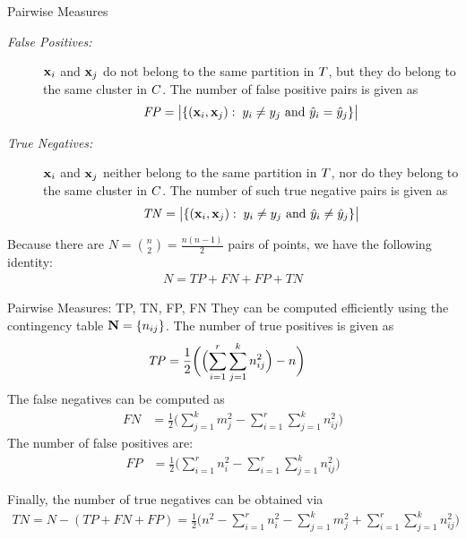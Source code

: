 \begin{frame}{Pairwise Measures}
  \begin{description}
\item[\textit{False Positives:}]
  $\mathbf{x}_i$ and $\mathbf{x}_{j}$ do not belong to the
  same partition in ${\relax T}$, but they do belong to the same cluster in ${\relax C}$.
  The
  number of false positive pairs is given as
  \begin{align*}
  \mathit{FP} = \bigl|\{(\mathbf{x}_i, \mathbf{x}_{j}):\; y_i \ne y_{j}
  \text{ and } \hat{y}_i = \hat{y}_{j} \}\bigr|
  \end{align*}

\item[\textit{True Negatives:}] $\mathbf{x}_i$ and $\mathbf{x}_{j}$ neither belong to
  the same partition in ${\relax T}$, nor do they belong to the same cluster in
  ${\relax C}$.  The number of such true negative pairs is given as
    \begin{align*}
  \mathit{TN} = \bigl|\{(\mathbf{x}_i, \mathbf{x}_{j}):\; y_i \ne y_{j}
  \text{ and } \hat{y}_i \ne \hat{y}_{j} \}\bigr|
  \end{align*}
\end{description}

Because there are $N = {n \choose 2} = \frac{n(n-1)}{2}$ pairs of points, we
have the following identity:
\begin{align*}
  N = \mathit{TP} + \mathit{FN} + \mathit{FP} + \mathit{TN}
\end{align*}
\end{frame}

\begin{frame}{Pairwise Measures: TP, TN, FP, FN}
They can be computed eff\/{i}ciently using the
contingency table $\mathbf{N} = \left\{ n_{ij} \right\}$.
The number of true positives is given as
\begin{align*}
  \mathit{TP} 
  & = \frac{1}{2} \biggl(\Bigl(\sum_{i=1}^r \sum_{j=1}^k n_{ij}^2\Bigr)
  - n \biggr)
\end{align*}
The false negatives can be computed as
\begin{align*}
  \mathit{FN} 
  & = \frac{1}{2}\biggl(
  \sum_{j=1}^k m_{j}^2 - \sum_{i=1}^r \sum_{j=1}^k n_{ij}^2 \biggr)
\end{align*}
The number of false positives are:
\begin{align*}
\mathit{FP} & =
  \frac{1}{2}\biggl(
  \sum_{i=1}^r n_i^2 - \sum_{i=1}^r \sum_{j=1}^k n_{ij}^2 \biggr)
\end{align*}

F{i}nally, the number of true negatives can be obtained via
\begin{align*}
  \mathit{TN} = N - (\mathit{TP} + \mathit{FN} + \mathit{FP}) = \frac{1}{2} \biggl(
  n^2 - \sum_{i=1}^r n_i^2 - \sum_{j=1}^k m_{j}^2 +
  \sum_{i=1}^r \sum_{j=1}^k n_{ij}^2
  \biggr)
\end{align*}
\end{frame}



